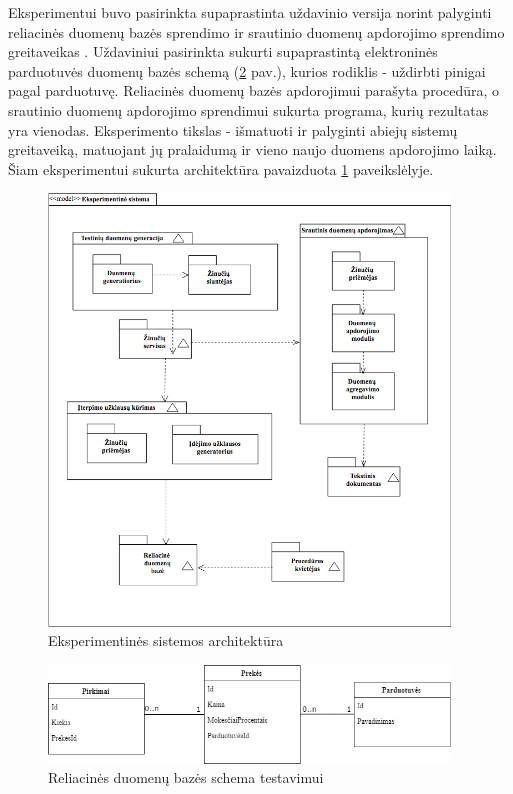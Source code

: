 \documentclass{VUMIFPSkursinis}
\begin{document}
Eksperimentui buvo pasirinkta supaprastinta uždavinio versija norint palyginti reliacinės duomenų bazės sprendimo ir srautinio duomenų 
apdorojimo sprendimo greitaveikas . Uždaviniui pasirinkta sukurti supaprastintą elektroninės parduotuvės duomenų bazės  schemą (\ref{fig:dbdiagram} pav.), 
kurios rodiklis - uždirbti pinigai pagal parduotuvę. Reliacinės duomenų bazės apdorojimui parašyta procedūra, o srautinio duomenų apdorojimo sprendimui sukurta programa, 
kurių rezultatas yra vienodas. Eksperimento tikslas - išmatuoti ir palyginti abiejų sistemų greitaveiką, matuojant jų pralaidumą ir vieno naujo duomens apdorojimo laiką.
Šiam eksperimentui sukurta architektūra pavaizduota \ref{fig:architecture} paveikslėlyje.
\begin{figure}[H]
    \centering
    \includegraphics[width=0.95\textwidth]{img/architecture.png}
    \caption{Eksperimentinės sistemos architektūra}
    \label{fig:architecture}
\end{figure}

\begin{figure}[H]
    \centering
    \includegraphics[width=0.95\textwidth]{img/dbdiagrama.jpg}
    \caption{Reliacinės duomenų bazės schema testavimui}
    \label{fig:dbdiagram}
\end{figure}
\end{document}
